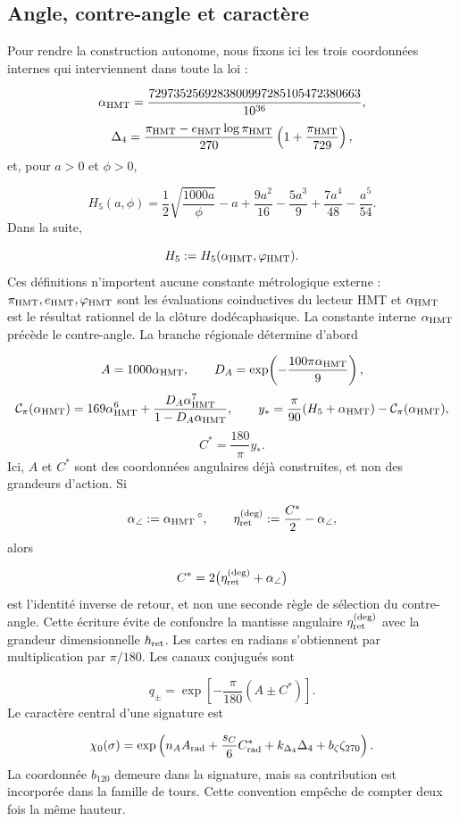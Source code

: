 \subsection{Angle, contre-angle et caractère}
Pour rendre la construction autonome, nous fixons ici les trois coordonnées internes qui interviennent dans toute la loi :

\[
\alpha_{\rm HMT}
=\frac{7297352569283800997285105472380663}{10^{36}},
\]
\[
\Delta_4
=\frac{\pi_{\rm HMT}-e_{\rm HMT}\log\pi_{\rm HMT}}{270}
\left(1+\frac{\pi_{\rm HMT}}{729}\right),
\]
et, pour \(a>0\) et \(\phi>0\),

\[
H_5(a,\phi)
=\frac12\sqrt{\frac{1000a}{\phi}}-a
+\frac{9a^2}{16}-\frac{5a^3}{9}
+\frac{7a^4}{48}-\frac{a^5}{54}.
\]
Dans la suite,

\[
H_5:=H_5(\alpha_{\rm HMT},\varphi_{\rm HMT}).
\]
Ces définitions n'importent aucune constante métrologique externe : \(\pi_{\rm HMT},e_{\rm HMT},\varphi_{\rm HMT}\) sont les évaluations coinductives du lecteur HMT et \(\alpha_{\rm HMT}\) est le résultat rationnel de la clôture dodécaphasique. La constante interne \(\alpha_{\rm HMT}\) précède le contre-angle. La branche régionale détermine d'abord

\[
A=1000\alpha_{\rm HMT},
\qquad
D_A=\exp\!\left(-\frac{100\pi\alpha_{\rm HMT}}9\right),
\]
\[
\mathcal C_\pi(\alpha_{\rm HMT})
=169\alpha_{\rm HMT}^{6}
+\frac{D_A\alpha_{\rm HMT}^{7}}
       {1-D_A\alpha_{\rm HMT}},
\qquad
y_*=\frac{\pi}{90}(H_5+\alpha_{\rm HMT})
-\mathcal C_\pi(\alpha_{\rm HMT}),
\]
\[
C^*=\frac{180}{\pi}y_*.
\]
Ici, \(A\) et \(C^*\) sont des coordonnées angulaires déjà construites, et non des grandeurs d'action. Si

\[
\alpha_\angle:=\alpha_{\rm HMT}\,{}^\circ,
\qquad
\eta_{\rm ret}^{(\deg)}:=\frac{C^*}{2}-\alpha_\angle,
\]
alors

\[
C^*=2\bigl(\eta_{\rm ret}^{(\deg)}+\alpha_\angle\bigr)
\]
est l'identité inverse de retour, et non une seconde règle de sélection du contre-angle. Cette écriture évite de confondre la mantisse angulaire \(\eta_{\rm ret}^{(\deg)}\) avec la grandeur dimensionnelle \(\hbar_{\rm ret}\). Les cartes en radians s'obtiennent par multiplication par \(\pi/180\). Les canaux conjugués sont

\[
q_\pm=\exp\left[-\frac\pi{180}(A\pm C^*)\right].
\]
Le caractère central d'une signature est

\[
\chi_0(\sigma)=
\exp\left(
n_AA_{\rm rad}
+\frac{s_C}{6}C^*_{\rm rad}
+k_{\Delta_4}\Delta_4
+b_\zeta\zeta_{270}
\right).
\]
La coordonnée \(b_{120}\) demeure dans la signature, mais sa contribution est incorporée dans la famille de tours. Cette convention empêche de compter deux fois la même hauteur.

